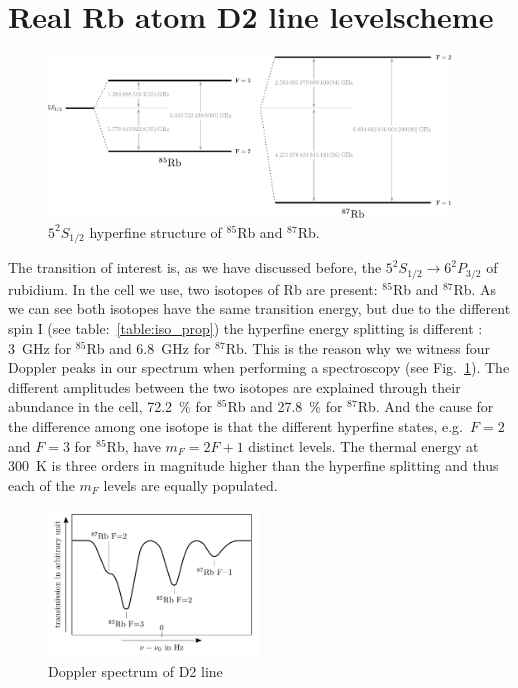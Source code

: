 \section{Real Rb atom D2 line levelscheme}\label{sec:realrubidium} %

\begin{figure}[ht]
    \centering
    \includegraphics[width=0.95\textwidth]{hyperfine_scheme}
    \caption{\(5^{2}S_{1/2} \) hyperfine structure of \(^{85}\)Rb 
    and \(^{87}\)Rb.}    
\end{figure}

The transition of interest is, as we have discussed before, the \(5^{2}S_{1/2} 
\rightarrow 6^{2}P_{3/2}\) of rubidium. In the cell we use, two isotopes of Rb 
are present: \(^{85}\)Rb and \(^{87}\)Rb.
As we can see both isotopes have the same transition energy, but due to the 
different spin I (see table:~\ref{table:iso_prop}) the hyperfine energy splitting
is different \citep{nist_asd}: \SI{3}{\giga\hertz} for \(^{85}\)Rb and 
\SI{6.8}{\giga\hertz} for \(^{87}\)Rb. This is the reason why we witness four 
Doppler peaks in our spectrum when performing a spectroscopy (see Fig.~\ref{fig:doppler}). 
The different amplitudes between the two isotopes are explained through their 
abundance in the cell, \SI{72.2}{\percent} for \(^{85}\)Rb and \SI{27.8}{\percent} 
for \(^{87}\)Rb. And the cause for the difference among one isotope is that the 
different hyperfine states, e.g.~\(F=2\) and \(F=3\) for \(^{85}\)Rb, have 
\(m_F = 2F+1 \) distinct levels. The thermal energy at \SI{300}{\kelvin} is 
three orders in magnitude higher than the hyperfine splitting and thus each of 
the \(m_F\) levels are equally populated.  

\begin{figure}[h]
\centering
\includegraphics[width=0.5\textwidth]{spectrum_doppler}
\caption{\label{fig:doppler}Doppler spectrum of D2 line} 
\end{figure}

